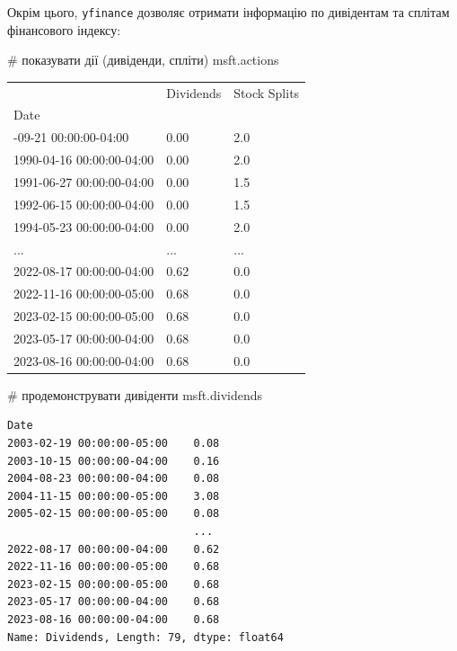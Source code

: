 \documentclass[
  letterpaper,
]{report}
\newenvironment{Shaded}{\begin{snugshade}}{\end{snugshade}}
\newcommand{\CommentTok}[1]{\textcolor[rgb]{0.37,0.37,0.37}{#1}}
\newcommand{\NormalTok}[1]{\textcolor[rgb]{0.00,0.23,0.31}{#1}}
\begin{document}
Окрім цього, \texttt{yfinance} дозволяє отримати інформацію по
дивідентам та сплітам фінансового індексу:

\begin{Shaded}
\begin{Highlighting}[]
\CommentTok{\# показувати дії (дивіденди, спліти)}
\NormalTok{msft.actions}
\end{Highlighting}
\end{Shaded}

\begin{longtable}[]{@{}lll@{}}
\toprule\noalign{}
& Dividends & Stock Splits \\
Date & & \\
\midrule\noalign{}
\endhead
\bottomrule\noalign{}
\endlastfoot
1987-09-21 00:00:00-04:00 & 0.00 & 2.0 \\
1990-04-16 00:00:00-04:00 & 0.00 & 2.0 \\
1991-06-27 00:00:00-04:00 & 0.00 & 1.5 \\
1992-06-15 00:00:00-04:00 & 0.00 & 1.5 \\
1994-05-23 00:00:00-04:00 & 0.00 & 2.0 \\
... & ... & ... \\
2022-08-17 00:00:00-04:00 & 0.62 & 0.0 \\
2022-11-16 00:00:00-05:00 & 0.68 & 0.0 \\
2023-02-15 00:00:00-05:00 & 0.68 & 0.0 \\
2023-05-17 00:00:00-04:00 & 0.68 & 0.0 \\
2023-08-16 00:00:00-04:00 & 0.68 & 0.0 \\
\end{longtable}

\begin{Shaded}
\begin{Highlighting}[]
\CommentTok{\# продемонструвати дивіденти}
\NormalTok{msft.dividends}
\end{Highlighting}
\end{Shaded}

\begin{verbatim}
Date
2003-02-19 00:00:00-05:00    0.08
2003-10-15 00:00:00-04:00    0.16
2004-08-23 00:00:00-04:00    0.08
2004-11-15 00:00:00-05:00    3.08
2005-02-15 00:00:00-05:00    0.08
                             ... 
2022-08-17 00:00:00-04:00    0.62
2022-11-16 00:00:00-05:00    0.68
2023-02-15 00:00:00-05:00    0.68
2023-05-17 00:00:00-04:00    0.68
2023-08-16 00:00:00-04:00    0.68
Name: Dividends, Length: 79, dtype: float64
\end{verbatim}
\end{document}
